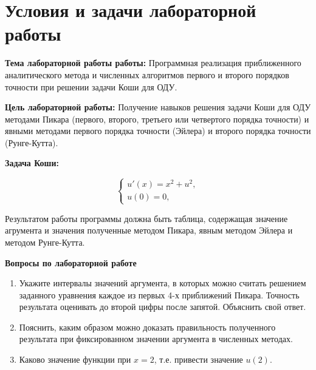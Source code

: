 \chapter{Условия и задачи лабораторной работы}
 	
 	\hspace{0cm} \textbf{Тема лабораторной работы работы:} Программная реализация приближенного аналитического метода и численных алгоритмов первого и второго порядков точности при решении задачи Коши для ОДУ.
 	
 	\hspace{0cm} \textbf{Цель лабораторной работы:} Получение навыков решения задачи Коши для ОДУ методами Пикара (первого, второго, третьего или четвертого порядка точности) и явными методами первого порядка точности (Эйлера) и второго порядка точности (Рунге-Кутта).

    \hspace{0cm} \textbf{Задача Коши:}
    
    \begin{equation*}
        \begin{cases}
            u'(x) = x^2 + u^2, \\
            u(0) = 0,
        \end{cases}
    \end{equation*}
    
    \hspace{0cm} Результатом работы программы должна быть таблица, содержащая значение агрумента и значения полученные методом Пикара, явным методом Эйлера и методом Рунге-Кутта.
    
    \hspace{0cm} \textbf{Вопросы по лабораторной работе} 
    
    \begin{enumerate}
    \item Укажите интервалы значений аргумента, в которых можно считать решением заданного уравнения каждое из первых 4-х приближений Пикара. Точность результата оценивать до второй цифры после запятой. Объяснить свой ответ.
    \item Пояснить, каким образом можно доказать правильность полученного результата при фиксированном значении аргумента в численных методах.
    \item Каково значение функции при $x=2$, т.е. привести значение $u(2)$.
\end{enumerate}

    \newpage
